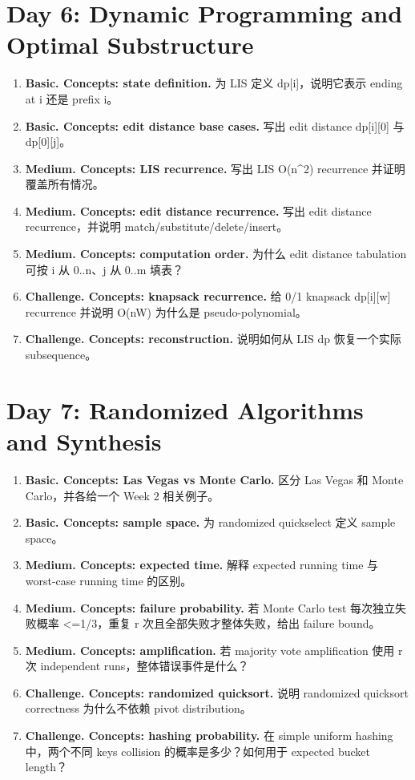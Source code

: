 \documentclass[11pt]{ctexart}
\begin{document}
\section{Day 6: Dynamic Programming and Optimal Substructure}
\begin{enumerate}
  \item \textbf{Basic. Concepts: state definition.} 为 LIS 定义 dp[i]，说明它表示 ending at i 还是 prefix i。
  \item \textbf{Basic. Concepts: edit distance base cases.} 写出 edit distance dp[i][0] 与 dp[0][j]。
  \item \textbf{Medium. Concepts: LIS recurrence.} 写出 LIS O(n\textasciicircum{}2) recurrence 并证明覆盖所有情况。
  \item \textbf{Medium. Concepts: edit distance recurrence.} 写出 edit distance recurrence，并说明 match/substitute/delete/insert。
  \item \textbf{Medium. Concepts: computation order.} 为什么 edit distance tabulation 可按 i 从 0..n、j 从 0..m 填表？
  \item \textbf{Challenge. Concepts: knapsack recurrence.} 给 0/1 knapsack dp[i][w] recurrence 并说明 O(nW) 为什么是 pseudo-polynomial。
  \item \textbf{Challenge. Concepts: reconstruction.} 说明如何从 LIS dp 恢复一个实际 subsequence。
\end{enumerate}

\section{Day 7: Randomized Algorithms and Synthesis}
\begin{enumerate}
  \item \textbf{Basic. Concepts: Las Vegas vs Monte Carlo.} 区分 Las Vegas 和 Monte Carlo，并各给一个 Week 2 相关例子。
  \item \textbf{Basic. Concepts: sample space.} 为 randomized quickselect 定义 sample space。
  \item \textbf{Medium. Concepts: expected time.} 解释 expected running time 与 worst-case running time 的区别。
  \item \textbf{Medium. Concepts: failure probability.} 若 Monte Carlo test 每次独立失败概率 <=1/3，重复 r 次且全部失败才整体失败，给出 failure bound。
  \item \textbf{Medium. Concepts: amplification.} 若 majority vote amplification 使用 r 次 independent runs，整体错误事件是什么？
  \item \textbf{Challenge. Concepts: randomized quicksort.} 说明 randomized quicksort correctness 为什么不依赖 pivot distribution。
  \item \textbf{Challenge. Concepts: hashing probability.} 在 simple uniform hashing 中，两个不同 keys collision 的概率是多少？如何用于 expected bucket length？
\end{enumerate}
\end{document}
